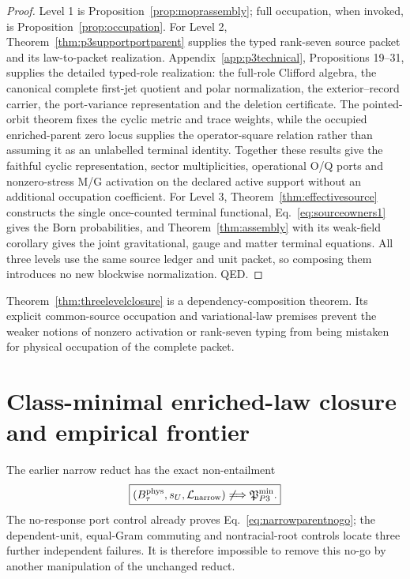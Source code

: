 \documentclass[11pt]{article}
\begin{document}
\begin{proof}
Level 1 is Proposition~\ref{prop:moprassembly}; full occupation, when invoked,
is Proposition~\ref{prop:occupation}.  For Level 2,
Theorem~\ref{thm:p3supportportparent} supplies the typed rank-seven source
packet and its law-to-packet realization.  Appendix~\ref{app:p3technical},
Propositions 19--31, supplies the detailed
typed-role realization: the full-role Clifford algebra, the canonical
complete first-jet quotient and polar normalization, the exterior--record
carrier, the port-variance representation and the deletion certificate.  The
pointed-orbit theorem fixes the cyclic metric and trace weights, while the
occupied enriched-parent zero locus supplies the operator-square relation
rather than assuming it as an unlabelled terminal identity.  Together these
results give the faithful
cyclic representation, sector multiplicities, operational O/Q ports and
nonzero-stress M/G activation on the declared active support without an
additional occupation coefficient.
For Level 3, Theorem~\ref{thm:effectivesource} constructs the single
once-counted terminal functional, Eq.~\eqref{eq:sourceowners1} gives the Born
probabilities, and Theorem~\ref{thm:assembly} with its weak-field corollary
gives the joint gravitational, gauge and matter terminal equations.  All
three levels use the same source ledger and unit packet, so composing them
introduces no new blockwise normalization. QED.
\end{proof}

Theorem~\ref{thm:threelevelclosure} is a dependency-composition theorem.  Its
explicit common-source occupation and variational-law premises prevent the weaker
notions of nonzero activation or rank-seven typing from being mistaken for
physical occupation of the complete packet.


\section{Class-minimal enriched-law closure and empirical frontier}
\label{sec:selectionfrontier}

The earlier narrow reduct has the exact non-entailment
\begin{equation}
 \boxed{
 (B_\tau^{\rm phys},s_U,\mathcal L_{\rm narrow})
 \not\Longrightarrow
 \mathfrak P_{P3}^{\min}.
 }
 \label{eq:narrowparentnogo}
\end{equation}
The no-response port control already proves Eq.~\eqref{eq:narrowparentnogo};
the dependent-unit, equal-Gram commuting and nontracial-root controls locate
three further independent failures.  It is therefore impossible to remove
this no-go by another manipulation of the unchanged reduct.
\end{document}
